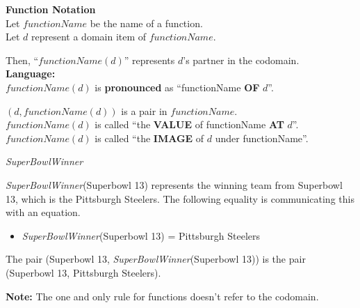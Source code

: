 \documentclass{ximera}
\begin{document}
\begin{notation} \textbf{\textcolor{green!50!black}{Function Notation}}  \\


Let $functionName$ be the name of a function. \\
Let $d$ represent a domain item of $functionName$.


Then, ``\textbf{\textcolor{green!50!black}{$functionName(d)$}}'' represents $d$'s partner in the codomain. \\


\textbf{\textcolor{red!80!black}{Language:}} \\
$functionName(d)$ is \textbf{\textcolor{blue!55!black}{pronounced}} as ``functionName \textbf{\textcolor{purple!85!blue}{OF}} $d$''.


$(d, functionName(d))$ is a pair in $functionName$. \\


$functionName(d)$ is called ``the \textbf{\textcolor{purple!85!blue}{VALUE}} of functionName \textbf{\textcolor{purple!85!blue}{AT}} $d$''. \\
$functionName(d)$ is called ``the \textbf{\textcolor{purple!85!blue}{IMAGE}} of $d$ under functionName''. \\



\end{notation}







\begin{example} \textit{SuperBowlWinner}


\textit{SuperBowlWinner}(Superbowl 13) represents the winning team from Superbowl 13, which is the Pittsburgh Steelers.  The following equality is communicating this with an equation.

\begin{itemize}
\item \textit{SuperBowlWinner}(Superbowl 13) = Pittsburgh Steelers  
\end{itemize}



The pair (Superbowl 13, \textit{SuperBowlWinner}(Superbowl 13)) is the pair (Superbowl 13, Pittsburgh Steelers). \

\end{example}

\textbf{Note:} The one and only rule for functions doesn't refer to the codomain.
\end{document}
